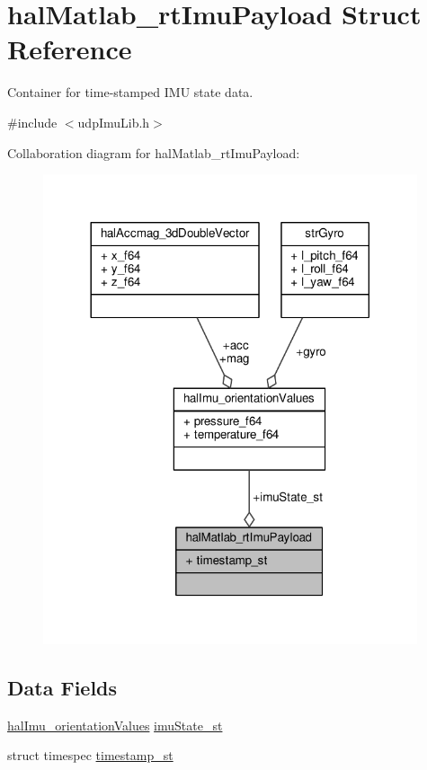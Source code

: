 \hypertarget{structhalMatlab__rtImuPayload}{\section{hal\+Matlab\+\_\+rt\+Imu\+Payload Struct Reference}
\label{structhalMatlab__rtImuPayload}
}


Container for time-\/stamped I\+M\+U state data.  




{\ttfamily \#include $<$udp\+Imu\+Lib.\+h$>$}



Collaboration diagram for hal\+Matlab\+\_\+rt\+Imu\+Payload\+:
\nopagebreak
\begin{figure}[H]
\begin{center}
\leavevmode
\includegraphics[width=312pt]{structhalMatlab__rtImuPayload__coll__graph}
\end{center}
\end{figure}
\subsection*{Data Fields}
\begin{DoxyCompactItemize}
\item 
\hyperlink{structhalImu__orientationValues}{hal\+Imu\+\_\+orientation\+Values} \hyperlink{structhalMatlab__rtImuPayload_a9c79ff85291d3492b09536e902c96c92_a9c79ff85291d3492b09536e902c96c92}{imu\+State\+\_\+st}
\item 
struct timespec \hyperlink{structhalMatlab__rtImuPayload_a884897c9695ab0e4d2d0fbe9677a60cd_a884897c9695ab0e4d2d0fbe9677a60cd}{timestamp\+\_\+st}
\end{DoxyCompactItemize}


